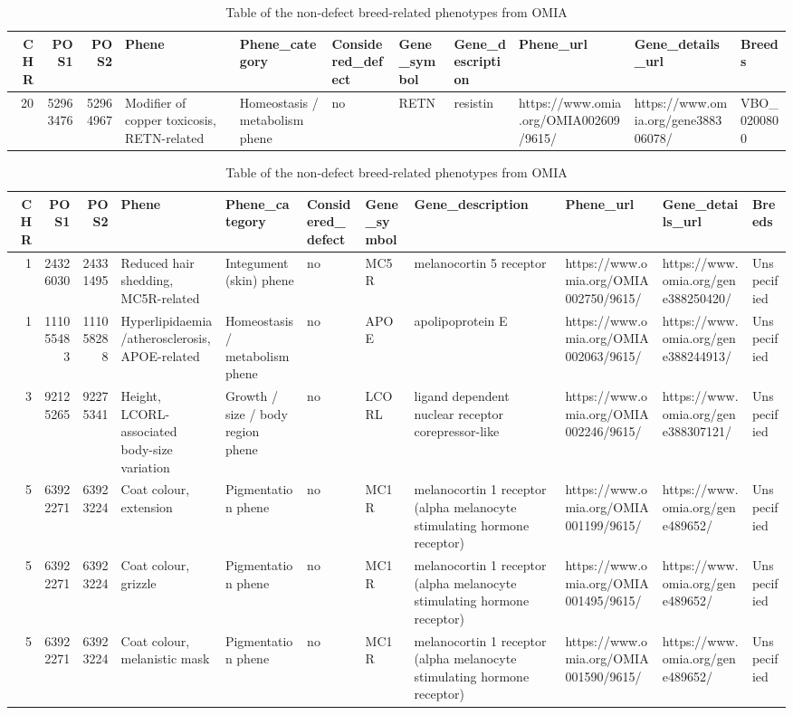 \documentclass[
]{article}
\begin{document}
\begin{table}
\caption{\label{tab:unnamed-chunk-8}Table of the non-defect breed-related phenotypes from OMIA}

\centering
\begin{tabular}[t]{r|r|r|l|l|l|l|l|l|l|l}
\hline
CHR & POS1 & POS2 & Phene & Phene\_category & Considered\_defect & Gene\_symbol & Gene\_description & Phene\_url & Gene\_details\_url & Breeds\\
\hline
20 & 52963476 & 52964967 & Modifier of copper toxicosis, RETN-related & Homeostasis / metabolism phene & no & RETN & resistin & https://www.omia.org/OMIA002609/9615/ & https://www.omia.org/gene388306078/ & VBO\_0200800\\
\hline
\end{tabular}
\centering
\begin{tabular}[t]{r|r|r|l|l|l|l|l|l|l|l}
\hline
CHR & POS1 & POS2 & Phene & Phene\_category & Considered\_defect & Gene\_symbol & Gene\_description & Phene\_url & Gene\_details\_url & Breeds\\
\hline
1 & 24326030 & 24331495 & Reduced hair shedding, MC5R-related & Integument (skin) phene & no & MC5R & melanocortin 5 receptor & https://www.omia.org/OMIA002750/9615/ & https://www.omia.org/gene388250420/ & Unspecified\\
\hline
1 & 111055483 & 111058288 & Hyperlipidaemia/atherosclerosis, APOE-related & Homeostasis / metabolism phene & no & APOE & apolipoprotein E & https://www.omia.org/OMIA002063/9615/ & https://www.omia.org/gene388244913/ & Unspecified\\
\hline
3 & 92125265 & 92275341 & Height, LCORL-associated body-size variation & Growth / size / body region phene & no & LCORL & ligand dependent nuclear receptor corepressor-like & https://www.omia.org/OMIA002246/9615/ & https://www.omia.org/gene388307121/ & Unspecified\\
\hline
5 & 63922271 & 63923224 & Coat colour, extension & Pigmentation phene & no & MC1R & melanocortin 1 receptor (alpha melanocyte stimulating hormone receptor) & https://www.omia.org/OMIA001199/9615/ & https://www.omia.org/gene489652/ & Unspecified\\
\hline
5 & 63922271 & 63923224 & Coat colour, grizzle & Pigmentation phene & no & MC1R & melanocortin 1 receptor (alpha melanocyte stimulating hormone receptor) & https://www.omia.org/OMIA001495/9615/ & https://www.omia.org/gene489652/ & Unspecified\\
\hline
5 & 63922271 & 63923224 & Coat colour, melanistic mask & Pigmentation phene & no & MC1R & melanocortin 1 receptor (alpha melanocyte stimulating hormone receptor) & https://www.omia.org/OMIA001590/9615/ & https://www.omia.org/gene489652/ & Unspecified\\

\end{tabular}
\end{table}
\end{document}
